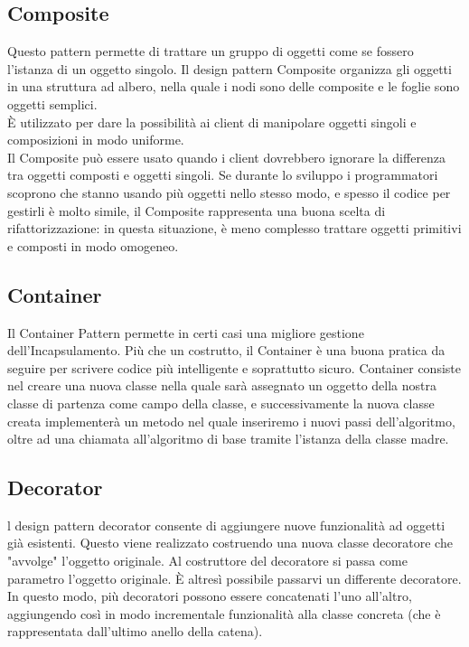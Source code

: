 \subsection{Composite}
Questo pattern permette di trattare un gruppo di oggetti come se fossero l'istanza di un oggetto singolo. Il design pattern Composite organizza gli oggetti in una struttura ad albero, nella quale i nodi sono delle composite e le foglie sono oggetti semplici.\\

È utilizzato per dare la possibilità ai client di manipolare oggetti singoli e composizioni in modo uniforme.
\\
Il Composite può essere usato quando i client dovrebbero ignorare la differenza tra oggetti composti e oggetti singoli. Se durante lo sviluppo i programmatori scoprono che stanno usando più oggetti nello stesso modo, e spesso il codice per gestirli è molto simile, il Composite rappresenta una buona scelta di rifattorizzazione: in questa situazione, è meno complesso trattare oggetti primitivi e composti in modo omogeneo.

\subsection{Container}
Il Container Pattern permette in certi casi una migliore gestione dell'Incapsulamento. Più che un costrutto, il Container è una buona pratica da seguire per scrivere codice più intelligente e soprattutto sicuro. 
 Container consiste nel creare una nuova classe nella quale sarà assegnato un oggetto della nostra classe di partenza come campo della classe, e successivamente la nuova classe creata implementerà un metodo nel quale inseriremo i nuovi passi dell'algoritmo, oltre ad una chiamata all'algoritmo di base tramite l'istanza della classe madre.
\subsection{Decorator}
l design pattern decorator consente di aggiungere nuove funzionalità ad oggetti già esistenti. Questo viene realizzato costruendo una nuova classe decoratore che "avvolge" l'oggetto originale. Al costruttore del decoratore si passa come parametro l'oggetto originale. È altresì possibile passarvi un differente decoratore. In questo modo, più decoratori possono essere concatenati l'uno all'altro, aggiungendo così in modo incrementale funzionalità alla classe concreta (che è rappresentata dall'ultimo anello della catena).

